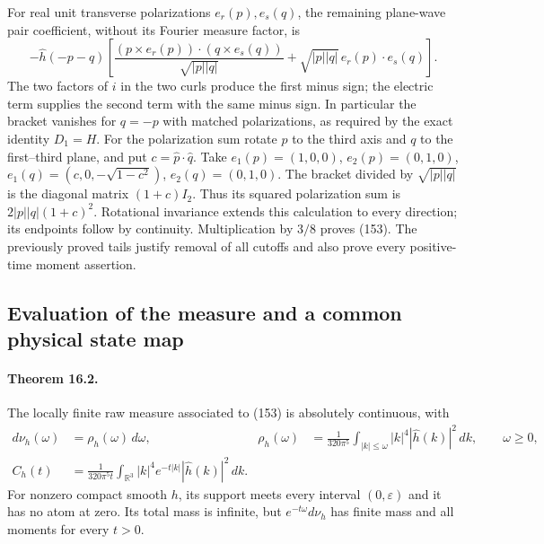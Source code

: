 \documentclass[11pt]{article}
\begin{document}
For real unit transverse polarizations $e_r(p),e_s(q)$, the remaining
plane-wave pair coefficient, without its Fourier measure factor, is
\begin{equation}\label{eq:full-plane-kernel}
 -\widehat h(-p-q)\left[
 \frac{ (p\times e_r(p))\cdot(q\times e_s(q))}{\sqrt{|p||q|}}
          +\sqrt{|p||q|}\,e_r(p)\cdot e_s(q)\right].
\end{equation}
The two factors of $i$ in the two curls produce the first minus
sign; the electric term supplies the second term with the same
minus sign. In particular the bracket vanishes for $q=-p$ with
matched polarizations, as required by the exact identity $D_1=H$.
For the polarization sum rotate $p$ to the third axis and $q$ to
the first--third plane, and put $c=\widehat p\cdot\widehat q$.
Take $e_1(p)=(1,0,0)$, $e_2(p)=(0,1,0)$,
$e_1(q)=(c,0,-\sqrt{1-c^2})$, $e_2(q)=(0,1,0)$.
The bracket divided by $\sqrt{|p||q|}$ is the diagonal matrix
$(1+c)I_2$. Thus its squared polarization sum is
$2|p||q|(1+c)^2$. Rotational invariance extends this calculation
to every direction; its endpoints follow by continuity.
Multiplication by $3/8$ proves (153).
The previously proved tails justify removal of all cutoffs and
also prove every positive-time moment assertion.



\subsection{Evaluation of the measure and a common physical state map}

\paragraph{Theorem 16.2.}
The locally finite raw measure associated to
(153) is absolutely continuous, with
\begin{align}
 d\nu_h(\omega)&=\rho_h(\omega)\,d\omega,&
 \rho_h(\omega)&=\frac{1}{320\pi^5}
       \int_{|k|\le\omega}|k|^4|\widehat h(k)|^2\,dk,
       \qquad \omega\ge0,\label{eq:full-density}\\
 C_h(t)&=\frac{1}{320\pi^5t}
       \int_{\mathbb R^3}|k|^4 e^{-t|k|}|\widehat h(k)|^2\,dk .
       \label{eq:full-laplace}
\end{align}
For nonzero compact smooth $h$, its support meets every interval
$(0,\varepsilon)$ and it has no atom at zero. Its total mass is
infinite, but $e^{-t\omega}d\nu_h$ has finite mass and all moments
for every $t>0$.
\end{document}
